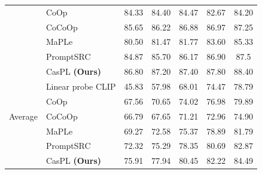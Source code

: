 \begin{table}[t!]
{\begin{tabular}{ll|ccccc}
                                       & CoOp                    & 84.33	&84.40	&84.47	&82.67	&84.20\\
                                       & CoCoOp                     & 85.65	&86.22	&86.88	&86.97	&87.25\\
                                       & MaPLe                  & 80.50 &81.47	&81.77&	83.60&	85.33\\
                                       & PromptSRC                & 84.87&	85.70	&86.17	&86.90	&87.5\\
                                       \rowcolor{tablecolor}
                                        & CasPL \textbf{(Ours) }   &86.80 &87.20 	&87.40 	&87.80 	&88.40      \\
                                        \hline
        \multirow{5}{*}{Average}       & Linear probe CLIP       & 45.83	&57.98	&68.01	&74.47&	78.79\\
                                       & CoOp                    & 67.56	&70.65	&74.02	&76.98	&79.89\\
                                       & CoCoOp                & 66.79&	67.65	&71.21&	72.96	&74.90\\
                                       & MaPLe                  & 69.27	&72.58	&75.37&	78.89&	81.79\\
                                       & PromptSRC               & 72.32	&75.29	&78.35	&80.69	&82.87\\
                                       \rowcolor{tablecolor} 
                                       & CasPL \textbf{(Ours) } &  75.91 & 77.94  & 80.45& 82.22 & 84.49   \\
        
        \hline
        \end{tabular}
        }
    \label{tab_appendix:few_shot_experiments}
\end{table}




% 
% 

